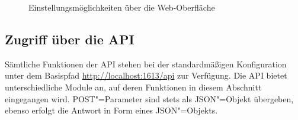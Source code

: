 \begin{figure}
\centering
{}
\qquad
{}
\caption{Einstellungsmöglichkeiten über die Web-Oberfläche}
\label{schlenke:fig:webuiConfig}
\end{figure}

\subsection{Zugriff über die API}
\label{schlenke:chp:api}

Sämtliche Funktionen der API stehen bei der standardmäßigen Konfiguration unter dem Basispfad \url{http://localhost:1613/api} zur Verfügung. Die API bietet unterschiedliche Module an, auf deren Funktionen in diesem Abschnitt eingegangen wird. POST"=Parameter sind stets als JSON"=Objekt übergeben, ebenso erfolgt die Antwort in Form eines JSON"=Objekts. 

